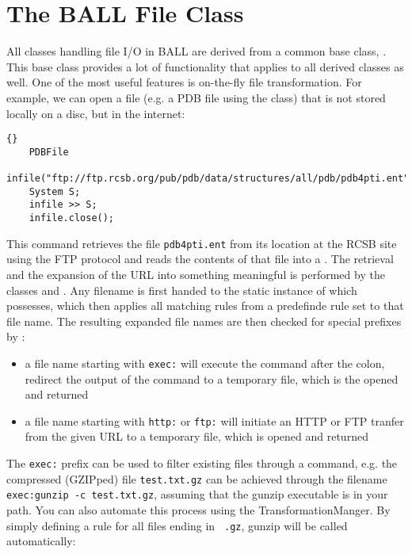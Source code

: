 \section{The BALL File Class}

All classes handling file I/O in BALL are derived from a common
base class, . This base class provides a lot of
functionality that applies to all derived classes as well.
One of the most useful features is on-the-fly file transformation.
For example, we can open a file (e.g. a PDB file using the  
class) that is not stored locally on a disc, but in the internet:

\begin{lstlisting}{}
	PDBFile
	infile("ftp://ftp.rcsb.org/pub/pdb/data/structures/all/pdb/pdb4pti.ent");
	System S;
	infile >> S;
	infile.close();
\end{lstlisting}

\noindent
This command retrieves the file {\tt pdb4pti.ent} from its location at the RCSB
site using the FTP protocol and reads the contents of that file into a
. The retrieval and the expansion of the URL into something
meaningful is performed by the classes  and
. Any filename is first handed to the static instance of
 which  possesses, which then applies
all matching rules from a predefinde rule set to that file name. The resulting
expanded file names are then checked for special prefixes by :
\begin{itemize}
	\item a file name starting with {\tt exec:} will execute the command after the
					colon, redirect the output of the command to a temporary file, which 	
					is the opened and returned
	\item a file name starting with {\tt http:} or {\tt ftp:} will initiate
					an HTTP or FTP tranfer from the given URL to a temporary file, which
					is opened and returned
\end{itemize}

\noindent 
The {\tt exec:} prefix can be used to filter existing files through a command, 
e.g. the compressed (GZIPped) file {\tt test.txt.gz} can be achieved through
the filename {\tt exec:gunzip -c test.txt.gz}, assuming that the gunzip
executable is in your path. You can also automate this process using the
TransformationManger. By simply defining a rule for all files ending in {\tt
.gz}, gunzip will be called automatically:

